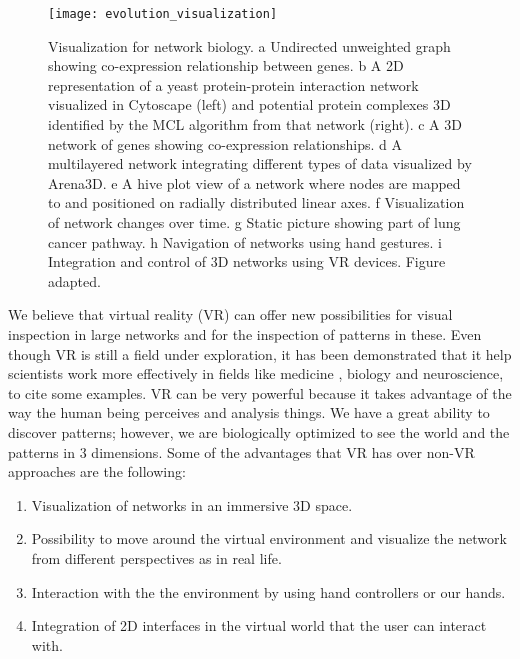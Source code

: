\begin{figure}[h!]
    \newlength{\tempheight}
    \setlength{\tempheight}{15ex}
    \centering%
    \texttt{[image: evolution\_visualization]}
    \caption{Visualization for network biology. a Undirected unweighted graph showing co-expression relationship between genes. b A 2D representation of a yeast protein-protein interaction network visualized in Cytoscape (left) and potential protein complexes 3D identified by the MCL algorithm from that network (right). c A 3D network of genes showing co-expression relationships. d A multilayered network integrating different types of data visualized by Arena3D. e A hive plot view of a network where nodes are mapped to and positioned on radially distributed linear axes. f Visualization of network changes over time. g Static picture showing part of lung cancer pathway. h Navigation of networks using hand gestures. i Integration and control of 3D networks using VR devices. Figure adapted\cite{pavlopoulos_malliarakis_papanikolaou_theodosiou_enright_iliopoulos_2015}.}
    \label{fig:network_biology_evolution}
\end{figure}%

We believe that virtual reality (VR) can offer new possibilities for visual inspection in large networks and for the inspection of patterns in these. Even though VR is still a field under exploration, it has been demonstrated that it help scientists work more effectively in fields like medicine \cite{Laver11}\cite{xia_ip_samman_wong_gateno_wang_yeung_kot_tideman_2001}\cite{brain_damage_rehab}, biology\cite{10.1093/bioinformatics/bti581}\cite{thorley_lawson_duca_shapiro_2008} and neuroscience\cite{bohil_alicea_biocca_2011}\cite{minderer_harvey_donato_moser_2016}, to  cite some examples. VR can be very powerful because it takes advantage of the way the human being perceives and analysis things. We have a great ability to discover patterns; however, we are biologically optimized to see the world and the patterns in 3 dimensions. Some of the advantages that VR has over non-VR approaches are the following:

\begin{enumerate}
  \item Visualization of networks in an immersive 3D space.
  \item Possibility to move around the virtual environment and visualize the network from different perspectives as in real life.
  \item Interaction with the the environment by using hand controllers or our hands.
  \item Integration of 2D interfaces in the virtual world that the user can interact with.
\end{enumerate}

